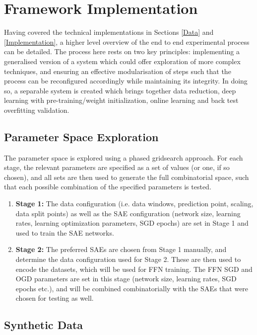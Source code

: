 \documentclass[a4paper,11pt,oneside]{article}
\theoremstyle{plain}
\theoremstyle{definition}
\begin{document}
		
		
	\newpage	
	\section{Framework Implementation}\label{imp_proc}
	
	Having covered the technical implementations in Sections \ref{Data} and \ref{Implementation}, a higher level overview of the end to end experimental process can be detailed. The process here rests on two key principles: implementing a generalised version of a system which could offer exploration of more complex techniques, and ensuring an effective modularisation of steps such that the process can be reconfigured accordingly while maintaining its integrity. In doing so, a separable system is created which brings together data reduction, deep learning with pre-training/weight initialization, online learning and back test overfitting validation.
	
	\subsection{Parameter Space Exploration}\label{proc_parameters}
	
	The parameter space is explored using a phased gridsearch approach. For each stage, the relevant parameters are specified as a set of values (or one, if so chosen), and all sets are then used to generate the full combinatorial space, such that each possible combination of the specified parameters is tested.
	
	\begin{enumerate}
		\item \textbf{Stage 1:} The data configuration (i.e. data windows, prediction point, scaling, data split points) as well as the SAE configuration (network size, learning rates, learning optimization parameters, SGD epochs) are set in Stage 1 and used to train the SAE networks.
		\item \textbf{Stage 2:} The preferred SAEs are chosen from Stage 1 manually, and determine the data configuration used for Stage 2. These are then used to encode the datasets, which will be used for FFN training. The FFN SGD and OGD parameters are set in this stage (network size, learning rates, SGD epochs etc.), and will be combined combinatorially with the SAEs that were chosen for testing as well.
	\end{enumerate}
	
	\subsection{Synthetic Data}\label{proc_synthetic}
	
\end{document}
